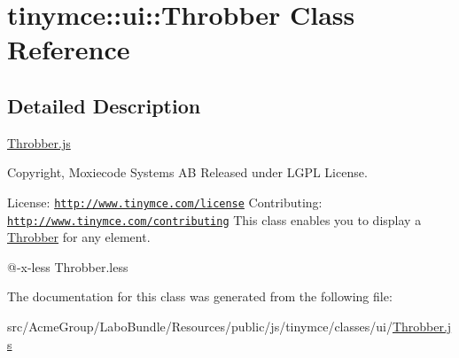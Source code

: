 \hypertarget{classtinymce_1_1ui_1_1_throbber}{\section{tinymce\+:\+:ui\+:\+:Throbber Class Reference}
\label{classtinymce_1_1ui_1_1_throbber}
}


\subsection{Detailed Description}
\hyperlink{_throbber_8js}{Throbber.\+js}

Copyright, Moxiecode Systems A\+B Released under L\+G\+P\+L License.

License\+: \href{http://www.tinymce.com/license}{\tt http\+://www.\+tinymce.\+com/license} Contributing\+: \href{http://www.tinymce.com/contributing}{\tt http\+://www.\+tinymce.\+com/contributing} This class enables you to display a \hyperlink{classtinymce_1_1ui_1_1_throbber}{Throbber} for any element.

@-\/x-\/less Throbber.\+less 

The documentation for this class was generated from the following file\+:\begin{DoxyCompactItemize}
\item 
src/\+Acme\+Group/\+Labo\+Bundle/\+Resources/public/js/tinymce/classes/ui/\hyperlink{_throbber_8js}{Throbber.\+js}\end{DoxyCompactItemize}
